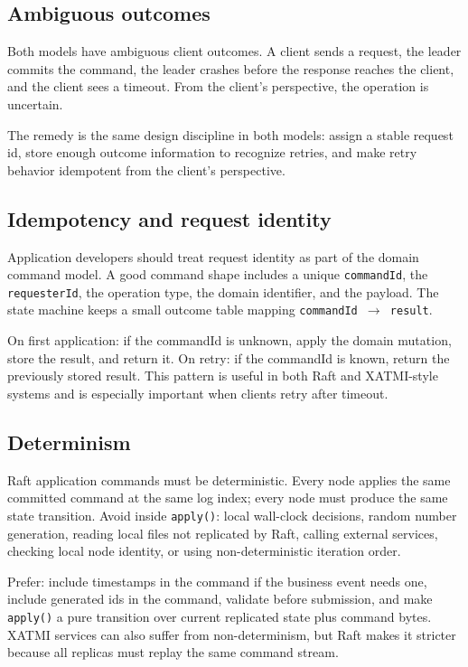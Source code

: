 \subsection{Ambiguous outcomes}

Both models have ambiguous client outcomes. A client sends a request, the
leader commits the command, the leader crashes before the response reaches
the client, and the client sees a timeout. From the client's perspective,
the operation is uncertain.

The remedy is the same design discipline in both models: assign a stable
request id, store enough outcome information to recognize retries, and
make retry behavior idempotent from the client's perspective.

\subsection{Idempotency and request identity}

Application developers should treat request identity as part of the domain
command model. A good command shape includes a unique
\texttt{commandId}, the \texttt{requesterId}, the operation type, the
domain identifier, and the payload. The state machine keeps a small
outcome table mapping \texttt{commandId $\to$ result}.

On first application: if the commandId is unknown, apply the domain
mutation, store the result, and return it. On retry: if the commandId is
known, return the previously stored result. This pattern is useful in
both Raft and XATMI-style systems and is especially important when clients
retry after timeout.

\subsection{Determinism}

Raft application commands must be deterministic. Every node applies the
same committed command at the same log index; every node must produce
the same state transition. Avoid inside \texttt{apply()}: local
wall-clock decisions, random number generation, reading local files not
replicated by Raft, calling external services, checking local node
identity, or using non-deterministic iteration order.

Prefer: include timestamps in the command if the business event needs one,
include generated ids in the command, validate before submission, and
make \texttt{apply()} a pure transition over current replicated state
plus command bytes. XATMI services can also suffer from non-determinism,
but Raft makes it stricter because all replicas must replay the same
command stream.

